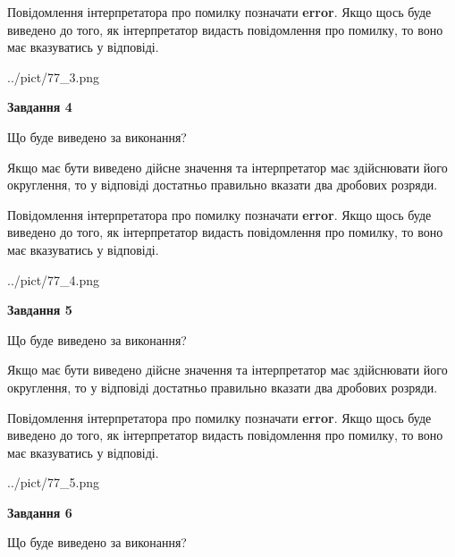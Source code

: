 \documentclass[12pt, ukrainian]{article}
\begin{document}
{\begin {Large}
Повідомлення інтерпретатора про помилку позначати \textbf{error}.
Якщо щось буде виведено до того, як інтерпретатор видасть повідомлення про помилку, 
то воно має вказуватись у відповіді. \par

\begin{center}
	{../pict/77_3.png}
\end{center}
\newpage

{\begin {center}\textbf{Завдання 4}\end {center}}\par
Що буде виведено за виконання? \par

Якщо має бути виведено дійсне значення та інтерпретатор має здійснювати його округлення, 
то у відповіді достатньо правильно вказати два дробових розряди.

Повідомлення інтерпретатора про помилку позначати \textbf{error}.
Якщо щось буде виведено до того, як інтерпретатор видасть повідомлення про помилку, 
то воно має вказуватись у відповіді. \par

\begin{center}
	{../pict/77_4.png}
\end{center}
\newpage

{\begin {center}\textbf{Завдання 5}\end {center}}\par
Що буде виведено за виконання? \par

Якщо має бути виведено дійсне значення та інтерпретатор має здійснювати його округлення, 
то у відповіді достатньо правильно вказати два дробових розряди.

Повідомлення інтерпретатора про помилку позначати \textbf{error}.
Якщо щось буде виведено до того, як інтерпретатор видасть повідомлення про помилку, 
то воно має вказуватись у відповіді. \par

\begin{center}
	{../pict/77_5.png}
\end{center}
\newpage

{\begin {center}\textbf{Завдання 6}\end {center}}\par
Що буде виведено за виконання? \par


\end{Large}}
\end{document}
